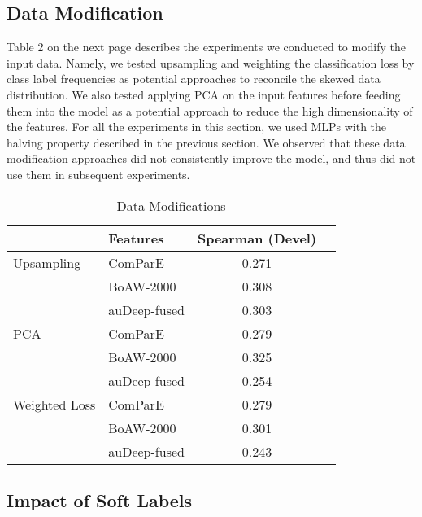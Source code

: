 \subsection{Data Modification}

Table 2 on the next page describes the experiments we conducted to modify the input data. Namely, we tested upsampling and weighting the classification loss by class label frequencies as potential approaches to reconcile the skewed data distribution. We also tested applying PCA on the input features before feeding them into the model as a potential approach to reduce the high dimensionality of the features. For all the experiments in this section, we used MLPs with the halving property described in the previous section.
We observed that these data modification approaches did not consistently improve the model, and thus did not use them in subsequent experiments.

\begin{table}[h]
\centering
\caption{Data Modifications}
\label{spk_id}
\begin{tabular}{llcc}
                            & Features    & {Spearman (Devel)} \\ \toprule
Upsampling                 & ComParE &  0.271           \\
                            & BoAW-2000 &  0.308           \\
                            & auDeep-fused     &  0.303           \\ \toprule
PCA                   & ComParE &  0.279           \\
                     & BoAW-2000 &  0.325           \\
                            & auDeep-fused     &  0.254           \\ \toprule
Weighted Loss                & ComParE &  0.279           \\
                       & BoAW-2000 &  0.301           \\
                            & auDeep-fused     &  0.243           \\ \bottomrule  
\end{tabular}
\end{table}

\subsection{Impact of Soft Labels}

